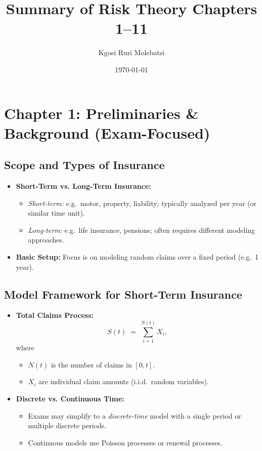 \documentclass[13pt,a4paper]{article}
\begin{document}
\title{Summary of Risk Theory Chapters 1--11}
\author{Kgosi Ruri Molebatsi}
\date{\today}
\maketitle

\tableofcontents

\section{Chapter 1: Preliminaries \& Background (Exam-Focused)}
\label{sec:chapter1}

\subsection{Scope and Types of Insurance}
\begin{itemize}
  \item \textbf{Short-Term vs. Long-Term Insurance:}
    \begin{itemize}
      \item \emph{Short-term:} e.g.\ motor, property, liability; typically analyzed per year (or similar time unit).
      \item \emph{Long-term:} e.g.\ life insurance, pensions; often requires different modeling approaches.
    \end{itemize}
  \item \textbf{Basic Setup:} Focus is on modeling random claims over a fixed period (e.g.\ 1 year).
\end{itemize}

\subsection{Model Framework for Short-Term Insurance}
\begin{itemize}
  \item \textbf{Total Claims Process:} 
  \[
    S(t) \;=\; \sum_{i=1}^{N(t)} X_i,
  \]
  where
  \begin{itemize}
    \item \(N(t)\) is the number of claims in \([0, t]\).
    \item \(X_i\) are individual claim amounts (i.i.d.\ random variables).
  \end{itemize}
  \item \textbf{Discrete vs. Continuous Time:}
    \begin{itemize}
      \item Exams may simplify to a \emph{discrete-time} model with a single period or multiple discrete periods.
      \item Continuous models use Poisson processes or renewal processes.
    \end{itemize}
\end{itemize}
\end{document}
